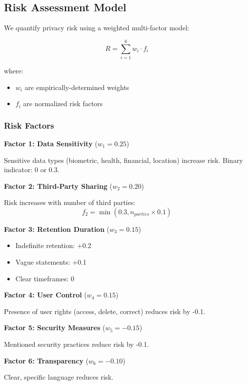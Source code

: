 \documentclass[conference]{IEEEtran}
\begin{document}
\subsection{Risk Assessment Model}

We quantify privacy risk using a weighted multi-factor model:

\begin{equation}
R = \sum_{i=1}^{6} w_i \cdot f_i
\end{equation}

where:
\begin{itemize}
    \item $w_i$ are empirically-determined weights
    \item $f_i$ are normalized risk factors
\end{itemize}

\subsubsection{Risk Factors}

\textbf{Factor 1: Data Sensitivity} ($w_1 = 0.25$)

Sensitive data types (biometric, health, financial, location) increase risk. Binary indicator: 0 or 0.3.

\textbf{Factor 2: Third-Party Sharing} ($w_2 = 0.20$)

Risk increases with number of third parties:
\begin{equation}
f_2 = \min(0.3, n_{parties} \times 0.1)
\end{equation}

\textbf{Factor 3: Retention Duration} ($w_3 = 0.15$)

\begin{itemize}
    \item Indefinite retention: +0.2
    \item Vague statements: +0.1
    \item Clear timeframes: 0
\end{itemize}

\textbf{Factor 4: User Control} ($w_4 = 0.15$)

Presence of user rights (access, delete, correct) reduces risk by -0.1.

\textbf{Factor 5: Security Measures} ($w_5 = -0.15$)

Mentioned security practices reduce risk by -0.1.

\textbf{Factor 6: Transparency} ($w_6 = -0.10$)

Clear, specific language reduces risk.
\end{document}
